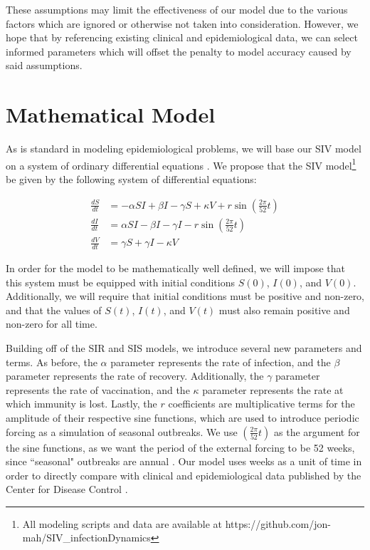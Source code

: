\documentclass[12pt]{article}
\begin{document}
These assumptions may limit the effectiveness of our model due to the various factors which are ignored or otherwise not taken into consideration. However, we hope that by referencing existing clinical and epidemiological data, we can select informed parameters which will offset the penalty to model accuracy caused by said assumptions.

\section{Mathematical Model} 

As is standard in modeling epidemiological problems, we will base our SIV model on a system of ordinary differential equations \citep{doi:10.1093/bmb/ldp038}. We propose that the SIV model\footnote{All modeling scripts and data are available at  https://github.com/jon-mah/SIV\_infectionDynamics} be given by the following system of differential equations:

\begin{equation} \label{SIV}
\begin{aligned}
\frac{dS}{dt} &= -\alpha S I + \beta I - \gamma S + \kappa V + r\sin(\frac{2 \pi}{52}t)\\
\frac{dI}{dt} &= \alpha S I - \beta I - \gamma I - r\sin(\frac{2 \pi}{52}t)\\
\frac{dV}{dt} &= \gamma S + \gamma I - \kappa V
\end{aligned}
\end{equation}

In order for the model to be mathematically well defined, we will impose that this system must be equipped with initial conditions $S(0)$, $I(0)$, and $V(0)$. Additionally, we will require that initial conditions must be positive and non-zero, and that the values of $S(t)$, $I(t)$, and $V(t)$ must also remain positive and non-zero for all time.

Building off of the SIR and SIS models, we introduce several new parameters and terms. As before, the $\alpha$ parameter represents the rate of infection, and the $\beta$ parameter represents the rate of recovery. Additionally, the $\gamma$ parameter represents the rate of vaccination, and the $\kappa$ parameter represents the rate at which immunity is lost. Lastly, the $r$ coefficients are multiplicative terms for the amplitude of their respective sine functions, which are used to introduce periodic forcing as a simulation of seasonal outbreaks. We use $( \frac{2 \pi}{52}t)$ as the argument for the sine functions, as we want the period of the external forcing to be 52 weeks, since ``seasonal" outbreaks are annual \citep{bedford2015global}. Our model uses weeks as a unit of time in order to directly compare with clinical and epidemiological data published by the Center for Disease Control \citep{centers2018weekly}.
\end{document}
